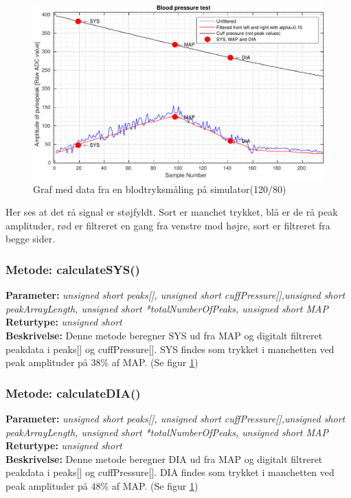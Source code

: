 \newpage
\begin{figure}[H]
	\includegraphics[width=\textwidth]{Implementeringsdokument/billeder/Alpha015-crop.pdf}
	\caption{Graf med data fra en blodtryksmåling på simulator(120/80)}\label{fig:bpMeasurement}
\end{figure}
Her ses at det rå signal er støjfyldt. Sort er manchet trykket, blå er de rå peak amplituder, rød er filtreret en gang fra venstre mod højre, sort	er filtreret fra begge sider.

\subsubsection{Metode: calculateSYS()}
\textbf{Parameter: } \textit{unsigned short peaks[], unsigned short cuffPressure[],unsigned short peakArrayLength, unsigned short *totalNumberOfPeaks, unsigned short MAP}
\\ \textbf{Returtype: } \textit{unsigned short}
\\ \textbf{Beskrivelse: } Denne metode beregner SYS ud fra MAP og digitalt filtreret peakdata i peaks[] og cuffPressure[]. SYS findes som trykket i manchetten ved peak amplituder på 38\% af MAP. (Se figur \ref{fig:bpMeasurement})

\subsubsection{Metode: calculateDIA()}
\textbf{Parameter: } \textit{unsigned short peaks[], unsigned short cuffPressure[],unsigned short peakArrayLength, unsigned short *totalNumberOfPeaks, unsigned short MAP}
\\ \textbf{Returtype: } \textit{unsigned short}
\\ \textbf{Beskrivelse: } Denne metode beregner DIA ud fra MAP og digitalt filtreret peakdata i peaks[] og cuffPressure[]. DIA findes som trykket i manchetten ved peak amplituder på 48\% af MAP. (Se figur \ref{fig:bpMeasurement})

